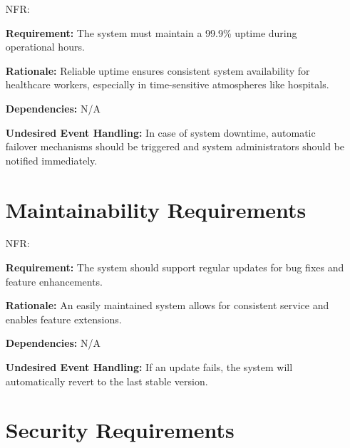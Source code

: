 \documentclass[12pt]{article}
\newcounter{nfrnum} %
\begin{document}
\begin{itemize}
\textbf{Rationale:} This would be essential to reduce the documentation time and workload for healthcare workers.

\textbf{Dependencies:} NFR\ref{NFR_Operational}, FR\ref{FR_DictationRecording}

\textbf{Undesired Event Handling:} In case of transcription delay or failure, an appropriate feedback message along with cause of error should be provided to the user.

\section{Operational Requirements} \label{NFR_Operational}

\item[NFR\refstepcounter{nfrnum}\thenfrnum \label{NFR_Operational}:]

\textbf{Requirement:} The system must maintain a 99.9\% uptime during operational hours.

\textbf{Rationale:} Reliable uptime ensures consistent system availability for healthcare workers, especially in time-sensitive atmospheres like hospitals.

\textbf{Dependencies:} N/A

\textbf{Undesired Event Handling:} In case of system downtime, automatic failover mechanisms should be triggered and system administrators should be notified immediately.

\section{Maintainability Requirements}

\item[NFR\refstepcounter{nfrnum}\thenfrnum \label{NFR_Maintainability}:]

\textbf{Requirement:} The system should support regular updates for bug fixes and feature enhancements.

\textbf{Rationale:} An easily maintained system allows for consistent service and enables feature extensions.

\textbf{Dependencies:} N/A

\textbf{Undesired Event Handling:} If an update fails, the system will automatically revert to the last stable version.

\section{Security Requirements} \label{NFR_Security}


\end{itemize}
\end{document}
